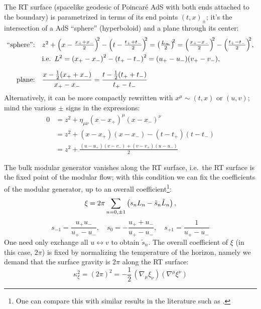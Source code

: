 \documentclass[11pt,a4paper,utf8]{article}
\begin{document}
	The RT surface (spacelike geodesic of Poincar\'e AdS with both ends attached to the boundary) is parametrized in terms of its end points $(t,x)_\pm$; it's the intersection of a AdS ``sphere'' (hyperboloid) and a plane through its center:
	\begin{equation}
	\begin{aligned}
	\text{``sphere'':} &&&\mathsmaller{
		z^2
		+ \pqty{x - \frac{x_+ + x_-}{2}}^{\!\!2}
		- \pqty{t - \frac{t_+ + t_-}{2}}^{\!\!2}
		= \pqty{\frac{L_\infty}{2}}^{\!\!2}
		= \pqty{\frac{x_+ - x_-}{2}}^{\!\!2}
		- \pqty{\frac{t_+ - t_-}{2}}^{\!\!2}
	},\\
	&&& \text{i.e.}\ \,
		L^2
		= \pqty{x_+ - x_-}^2
			- \pqty{t_+ - t_-}^2
		= (u_+ - u_-)(v_+ - v_-),
	\\[1.5ex]
	\text{plane:} &&&
		\frac{x - \frac{1}{2} (x_+ + x_-)}{x_+ - x_-}
		= \frac{t - \frac{1}{2} (t_+ + t_-)}{t_+ - t_-}
	\end{aligned}
	\end{equation}
	Alternatively, it can be more compactly rewritten with $x^\mu \sim (t,x)$ or $(u,v)$; mind the various $\pm$ signs in the expressions: 
	\begin{equation}
	\begin{aligned}
		0 &= z^2
			+ \eta_{\mu\nu} (x - x_+)^\mu (x - x_-)^\nu \\
		& = z^2
			+ (x - x_+)(x - x_-)
			- (t - t_+)(t - t_-) \\
		&= z^2 + \frac{
				(u - u_+)(v - v_-)
				+ (v - v_+)(u - u_-)
			}{2}
	\end{aligned}
	\end{equation}
	
	The bulk modular generator vanishes along the RT surface, i.e.~the RT surface is the fixed point of the modular flow; with this condition we can fix the coefficients of the modular generator, up to an overall coefficient\footnote{
		One can compare this with similar results in the literature such as \cite{Lashkari:2016idm,Czech:2019vih,Apolo:2020qjm}. 
	}:
	\begin{equation}
		\xi = 2\pi \sum_{n=0,\pm 1} \left(
				s_n L_n - \tilde{s}_n \tilde{L}_n
			\right),
	\end{equation}
	\begin{equation}
		s_{-1} = \frac{u_+ u_-}{u_+ - u_-},\quad
		s_0 = - \frac{u_+ + u_-}{u_+ - u_-},\quad
		s_{+1} = \frac{1}{u_+ - u_-}
	\end{equation}
	One need only exchange all $u\leftrightarrow v$ to obtain $\tilde{s}_n$. The overall coefficient of $\xi$ (in this case, $2\pi$) is fixed by normalizing the temperature of the horizon, namely we demand that the surface gravity is $2\pi$ along the RT surface:
	\begin{equation}
		\kappa_\xi^2
		= (2\pi)^2
		= -\frac{1}{2}\,
			(\nabla_{\mu} \xi_{\nu})
			(\nabla^{\mu} \xi^{\nu})
	\end{equation}
	
\end{document}
